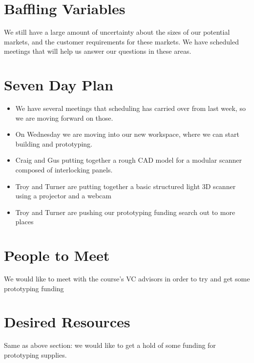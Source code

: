 \documentclass[10pt]{article}
\begin{document}
\section{Baffling Variables}
We still have a large amount of uncertainty about the sizes of our potential
markets, and the customer requirements for these markets. We have scheduled
meetings that will help us answer our questions in these areas.

\section{Seven Day Plan}
\begin{itemize}
\item We have several meetings that scheduling has carried over from
  last week, so we are moving forward on those.
\item On Wednesday we are moving into our new workspace, where we can start
  building and prototyping.
\item Craig and Gus putting together a rough CAD model for a modular scanner
  composed of interlocking panels. 
\item Troy and Turner are putting together a basic structured light 3D scanner
  using a projector and a webcam
\item Troy and Turner are pushing our prototyping funding search out to more
  places 
\end{itemize}

\section{People to Meet}
We would like to meet with the course's VC advisors in order to try and get some
prototyping funding

\section{Desired Resources}
Same as above section: we would like to get a hold of some funding for
prototyping supplies.
\end{document}

